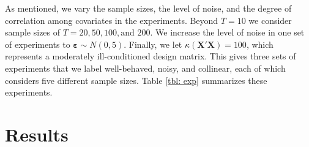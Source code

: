 \documentclass{elsarticle}
\begin{document}
As mentioned, we vary the sample sizes, the level of noise, and the degree of 
correlation among covariates in the experiments.
Beyond $T=10$ we consider sample sizes of $T=20, 50, 100, \text{and } 200$. 
We increase the level of noise in one set of experiments to  
$\mathbf{\varepsilon} \sim N(0,5)$.
Finally, we let $\kappa(\mathbf{X}'\mathbf{X})=100$, which represents a moderately 
ill-conditioned design matrix.
This gives three sets of experiments that we label well-behaved, noisy, and collinear, 
each of which considers five different sample sizes.
Table \ref{tbl: exp} summarizes these experiments.

\footnotesize
{}
\normalsize


\section{Results}
\label{sec: results}
\end{document}
